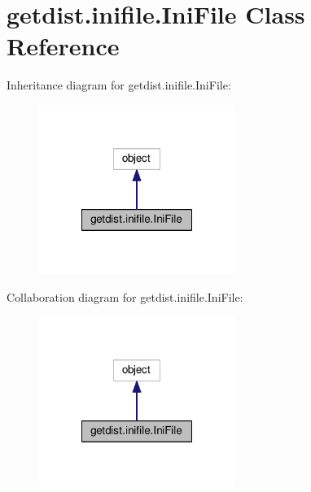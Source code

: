 \hypertarget{classgetdist_1_1inifile_1_1IniFile}{}\section{getdist.\+inifile.\+Ini\+File Class Reference}
\label{classgetdist_1_1inifile_1_1IniFile}


Inheritance diagram for getdist.\+inifile.\+Ini\+File\+:
\nopagebreak
\begin{figure}[H]
\begin{center}
\leavevmode
\includegraphics[width=180pt]{classgetdist_1_1inifile_1_1IniFile__inherit__graph}
\end{center}
\end{figure}


Collaboration diagram for getdist.\+inifile.\+Ini\+File\+:
\nopagebreak
\begin{figure}[H]
\begin{center}
\leavevmode
\includegraphics[width=180pt]{classgetdist_1_1inifile_1_1IniFile__coll__graph}
\end{center}
\end{figure}
